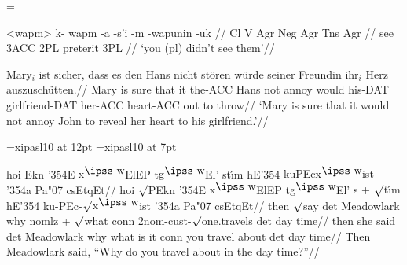 
%
%

\def\small{\tenrm}
\def\suff#1{{-\small #1}}%
\everymath={}

\makeatletter
\def\glmw@printcolframed{%
   \psframebox[framesep=0]{\vtop{%
      \ling@everyglword
      \gl@loopmoretrue
      \loop\ifgl@loopmore
         \lop\tempa\to\@tempa
         \lop\aboveskiplist\to\@aboveskip
         \lop\strutlist\to\@strut
         \@aboveskip\hbox{\@strut\@tempa}%
         \ifx\tempa\empty \gl@loopmorefalse \fi
      \repeat
      }}%
}
\def\framewords{\let\glmw@printcol=\glmw@printcolframed}
\resetatcatcode

\ex<wapm>
\begingl
\gla k- wapm -a -s'i -m -wapunin -uk //
\glb Cl V Agr Neg Agr Tns Agr //
 see {3\sc ACC} {} 2{\sc PL} preterit 3{\sc PL} //
\glft `you (pl) didn't see them'//
\endgl
\xe

\ex
\begingl
\gla Mary$_i$ ist sicher, dass es den Hans nicht st\"oren w\"urde
seiner Freundin ihr$_i$ Herz auszusch\"utten.//
\glb Mary is sure that it the-{\sc ACC} Hans not annoy would
his-{\sc DAT} girlfriend-{\sc DAT} her-{\sc ACC} heart-{\sc ACC} {out to
throw}//
\glft  `Mary is sure that it would not annoy John to reveal her
heart to his girlfriend.'//
\endgl
\xe

\font\ips=xipasl10 at 12pt
\font\ipss=xipasl10 at 7pt
\def\mroot{$\surd$}
\def\L{\char'354}
\def\v#1{{\accent"07 #1}}
\def\C{{\accent"07 c}}
\def\W{$^{\hbox{\ipss w}}\mskip-2mu$}


\ex
\begingl
\gla[everygla=\ips] hoi Ekn {\L}E {x\W}ElEP t{g\W}El' st{\'\i}m {hE\L}
   {kuPEcx\W ist} {\L a} Pa{\v c}sEtqEt//
\glb[everyglb=\ips] hoi {\mroot}PEkn {\L}E {x\W}ElEP t{g\W}El' {s +
   \mroot t\'\i m} {hE\L} ku-PEc-\mroot{x\W}ist {\L}a Pa{\v c}sEtqEt//
\glb then {\mroot}say det Meadowlark why {nomlz + \mroot what} conn
   2nom-cust-{\mroot}one.travels det {day time}//
\glb then {she said} det Meadowlark why {what is it} conn {you travel
   about} det {day time}//
\glft Then Meadowlark said, ``Why do you travel about in the day
   time?''//
\endgl
\xe

